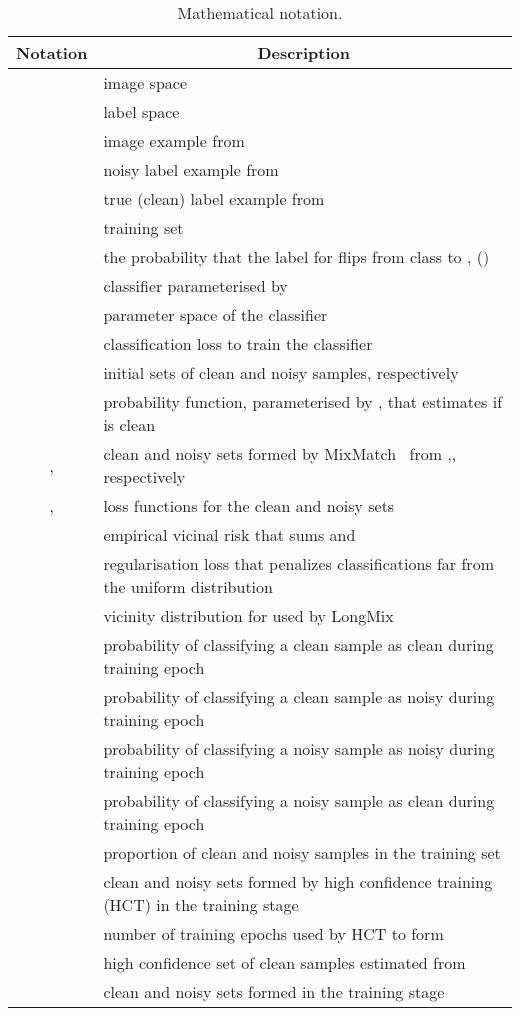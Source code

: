 \documentclass[review]{elsarticle}
\begin{document}
\begin{table}[ht]
\centering
\scriptsize
\begin{tabular}{|c|l|}
\hline
\multicolumn{1}{|c|}{Notation}& \multicolumn{1}{c|}{Description}\\
\hline\hline
 & image space \\
 & label space \\
 &  image example from  \\
 &  noisy label example from  \\
 & true (clean) label example from  \\
 & training set \\
 & the probability that the label for  flips from class  to , ()\\
 & classifier parameterised by \\
 & parameter space of the classifier\\
 & classification loss to train the classifier \\
 & initial sets of clean and noisy samples, respectively \\
 & probability function, parameterised by , that estimates if  is clean \\
, & clean and noisy sets formed by MixMatch~\cite{berthelot2019mixmatch} from ,, respectively\\
,  & loss functions for the clean and noisy sets \\
 & empirical vicinal risk that sums  and  \\
 & regularisation loss that penalizes classifications far from the uniform distribution \\
 & vicinity distribution for  used by LongMix\\
 & probability of classifying a clean sample as clean during training epoch \\
 & probability of classifying a clean sample as noisy during training epoch \\
 & probability of classifying a noisy sample as noisy during training epoch \\
 & probability of classifying a noisy sample as clean during training epoch \\
 &  proportion of clean and noisy
samples in the training set \\
 & clean and noisy sets formed by high confidence training (HCT) in the  training stage\\
 & number of training epochs used by HCT to form  \\
 & high confidence set of clean samples estimated from  \\
 & clean and noisy sets formed in the  training stage\\
\hline
\end{tabular}
\caption{Mathematical notation.}
\label{tab:mathematical_notation}
\end{table}
\end{document}
